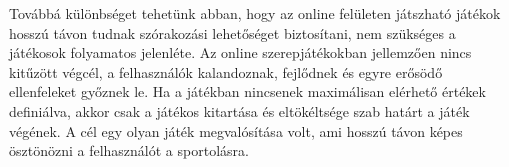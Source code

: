Továbbá különbséget tehetünk abban, hogy az online felületen játszható játékok hosszú távon tudnak szórakozási lehetőséget biztosítani, nem szükséges a játékosok folyamatos jelenléte. 
Az online szerepjátékokban jellemzően nincs kitűzött végcél, a felhasználók kalandoznak, fejlődnek és egyre erősödő ellenfeleket győznek le. 
Ha a játékban nincsenek maximálisan elérhető értékek definiálva, akkor  csak a játékos kitartása és eltökéltsége szab határt a játék végének. 
A cél egy olyan játék megvalósítása volt, ami hosszú távon képes ösztönözni a felhasználót a sportolásra.

\newpage